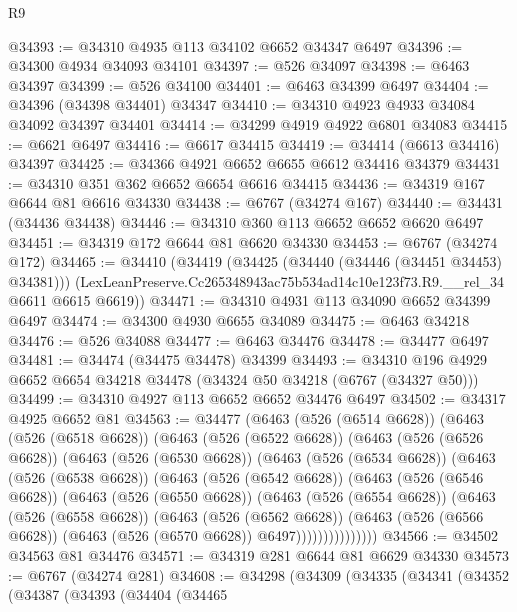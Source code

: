 \begin{lexlean}{R9}
\begin{coremodule}
@34393 := @34310 @4935 @113 @34102 @6652 @34347 @6497
@34396 := @34300 @4934 @34093 @34101
@34397 := @526 @34097
@34398 := @6463 @34397
@34399 := @526 @34100
@34401 := @6463 @34399 @6497
@34404 := @34396 (@34398 @34401) @34347
@34410 := @34310 @4923 @4933 @34084 @34092 @34397 @34401
@34414 := @34299 @4919 @4922 @6801 @34083
@34415 := @6621 @6497
@34416 := @6617 @34415
@34419 := @34414 (@6613 @34416) @34397
@34425 := @34366 @4921 @6652 @6655 @6612 @34416 @34379
@34431 := @34310 @351 @362 @6652 @6654 @6616 @34415
@34436 := @34319 @167 @6644 @81 @6616 @34330
@34438 := @6767 (@34274 @167)
@34440 := @34431 (@34436 @34438)
@34446 := @34310 @360 @113 @6652 @6652 @6620 @6497
@34451 := @34319 @172 @6644 @81 @6620 @34330
@34453 := @6767 (@34274 @172)
@34465 := @34410
    (@34419
      (@34425 (@34440 (@34446 (@34451 @34453) @34381)))
      (LexLeanPreserve.Cc265348943ac75b534ad14c10e123f73.R9.__rel_34 @6611 @6615 @6619))
@34471 := @34310 @4931 @113 @34090 @6652 @34399 @6497
@34474 := @34300 @4930 @6655 @34089
@34475 := @6463 @34218
@34476 := @526 @34088
@34477 := @6463 @34476
@34478 := @34477 @6497
@34481 := @34474 (@34475 @34478) @34399
@34493 := @34310 @196 @4929 @6652 @6654 @34218 @34478 (@34324 @50 @34218 (@6767 (@34327 @50)))
@34499 := @34310 @4927 @113 @6652 @6652 @34476 @6497
@34502 := @34317 @4925 @6652 @81
@34563 := @34477
    (@6463
      (@526 (@6514 @6628))
      (@6463
        (@526 (@6518 @6628))
        (@6463
          (@526 (@6522 @6628))
          (@6463
            (@526 (@6526 @6628))
            (@6463
              (@526 (@6530 @6628))
              (@6463
                (@526 (@6534 @6628))
                (@6463
                  (@526 (@6538 @6628))
                  (@6463
                    (@526 (@6542 @6628))
                    (@6463
                      (@526 (@6546 @6628))
                      (@6463
                        (@526 (@6550 @6628))
                        (@6463
                          (@526 (@6554 @6628))
                          (@6463
                            (@526 (@6558 @6628))
                            (@6463
                              (@526 (@6562 @6628))
                              (@6463
                                (@526 (@6566 @6628))
                                (@6463 (@526 (@6570 @6628)) @6497)))))))))))))))
@34566 := @34502 @34563 @81 @34476
@34571 := @34319 @281 @6644 @81 @6629 @34330
@34573 := @6767 (@34274 @281)
@34608 := @34298
    (@34309
      (@34335
        (@34341
          (@34352
            (@34387
              (@34393
                (@34404
                  (@34465

\end{coremodule}
\end{lexlean}
